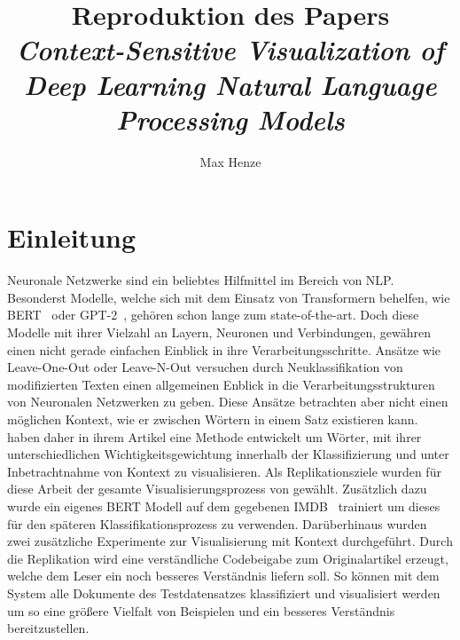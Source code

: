 \documentclass[DIV=13,fontsize=11pt]{scrartcl}
\begin{document}
\subject{Projektbericht zum Modul Data Mining Wintersemester 20221/2022}
\title{Reproduktion des Papers \\ \textit{Context-Sensitive Visualization of Deep Learning Natural Language Processing Models}\cite{dunn2021context}}
\author{Max Henze}%
\maketitle%

\section{Einleitung}

Neuronale Netzwerke sind ein beliebtes Hilfmittel im Bereich von NLP.
Besonderst Modelle, welche sich mit dem Einsatz von Transformern behelfen,
wie BERT~\cite{devlin2018bert} oder GPT-2~\cite{radford2019language},
gehören schon lange zum state-of-the-art. Doch diese Modelle mit ihrer
Vielzahl an Layern, Neuronen und Verbindungen, gewähren einen nicht
gerade einfachen Einblick in ihre Verarbeitungsschritte. Ansätze wie Leave-One-Out
oder Leave-N-Out versuchen durch Neuklassifikation von modifizierten Texten einen
allgemeinen Enblick in die Verarbeitungsstrukturen von Neuronalen Netzwerken zu geben.
Diese Ansätze betrachten aber nicht einen möglichen Kontext, wie er zwischen
Wörtern in einem Satz existieren kann.
\citeauthor{dunn2021context} haben daher in ihrem Artikel 
eine Methode entwickelt um Wörter, mit ihrer unterschiedlichen Wichtigkeitsgewichtung
innerhalb der Klassifizierung und unter Inbetrachtnahme von Kontext zu visualisieren.
Als Replikationsziele wurden für diese Arbeit der gesamte Visualisierungsprozess
von \citeauthor{dunn2021context} gewählt. Zusätzlich dazu wurde ein eigenes
BERT Modell auf dem gegebenen IMDB~\cite{maas-EtAl:2011:ACL-HLT2011} trainiert um
dieses für den späteren Klassifikationsprozess zu verwenden. Darüberhinaus
wurden zwei zusätzliche Experimente zur Visualisierung mit Kontext durchgeführt.
Durch die Replikation wird eine verständliche Codebeigabe zum Originalartikel
erzeugt, welche dem Leser ein noch besseres Verständnis liefern soll. So können
mit dem System alle Dokumente des Testdatensatzes klassifiziert und visualisiert werden
um so eine größere Vielfalt von Beispielen und ein besseres Verständnis bereitzustellen.
\end{document}
